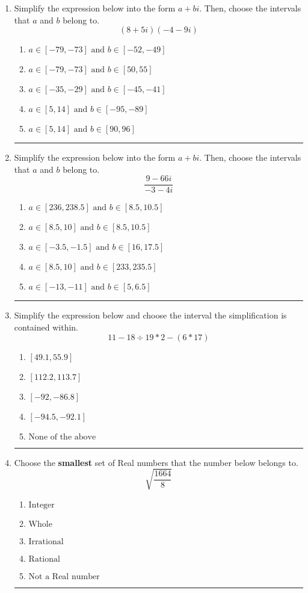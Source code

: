 \documentclass[14pt]{extbook}
\newcommand{\litem}[1]{\item#1\hspace*{-1cm}\rule{\textwidth}{0.4pt}}
\begin{document}
\begin{enumerate}
{\begin{enumerate}[label=\Alph*.]
\end{enumerate} }
\litem{
Simplify the expression below into the form $a+bi$. Then, choose the intervals that $a$ and $b$ belong to.\[ (8 + 5 i)(-4 - 9 i) \]\begin{enumerate}[label=\Alph*.]
\item \( a \in [-79, -73] \text{ and } b \in [-52, -49] \)
\item \( a \in [-79, -73] \text{ and } b \in [50, 55] \)
\item \( a \in [-35, -29] \text{ and } b \in [-45, -41] \)
\item \( a \in [5, 14] \text{ and } b \in [-95, -89] \)
\item \( a \in [5, 14] \text{ and } b \in [90, 96] \)

\end{enumerate} }
\litem{
Simplify the expression below into the form $a+bi$. Then, choose the intervals that $a$ and $b$ belong to.\[ \frac{9 - 66 i}{-3 - 4 i} \]\begin{enumerate}[label=\Alph*.]
\item \( a \in [236, 238.5] \text{ and } b \in [8.5, 10.5] \)
\item \( a \in [8.5, 10] \text{ and } b \in [8.5, 10.5] \)
\item \( a \in [-3.5, -1.5] \text{ and } b \in [16, 17.5] \)
\item \( a \in [8.5, 10] \text{ and } b \in [233, 235.5] \)
\item \( a \in [-13, -11] \text{ and } b \in [5, 6.5] \)

\end{enumerate} }
\litem{
Simplify the expression below and choose the interval the simplification is contained within.\[ 11 - 18 \div 19 * 2 - (6 * 17) \]\begin{enumerate}[label=\Alph*.]
\item \( [49.1, 55.9] \)
\item \( [112.2, 113.7] \)
\item \( [-92, -86.8] \)
\item \( [-94.5, -92.1] \)
\item \( \text{None of the above} \)

\end{enumerate} }
\litem{
Choose the \textbf{smallest} set of Real numbers that the number below belongs to.\[ \sqrt{\frac{1664}{8}} \]\begin{enumerate}[label=\Alph*.]
\item \( \text{Integer} \)
\item \( \text{Whole} \)
\item \( \text{Irrational} \)
\item \( \text{Rational} \)
\item \( \text{Not a Real number} \)


\end{enumerate}}
\end{enumerate}
\end{document}
